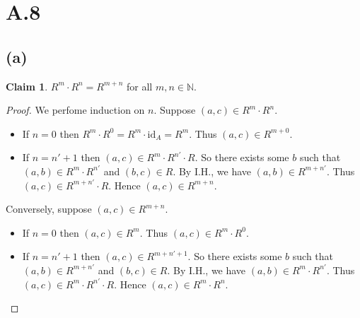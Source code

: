 \documentclass[autodetect-enginem]{article}
\title{}
\author{}
\date{}
\theoremstyle{plain}
\theoremstyle{definition}
\theoremstyle{definition}
\newtheorem*{claim}{Claim}
\begin{document}
\section*{A.8}
\subsection*{(a)}
    \begin{claim}
        $R^m \cdot R^n = R^{m+n}$ for all $m,n \in \mathbb{N}$.
    \end{claim}

    \begin{proof}
        We perfome induction on $n$.
        Suppose $(a,c) \in R^m \cdot R^n$.
        \begin{itemize}
            \item If $n = 0$ then $R^m \cdot R^0 = R^m \cdot \mathrm{id}_A = R^m$.
                    Thus $(a,c) \in R^{m+0}$.
            \item If $n = n' + 1$ then $(a,c) \in R^m \cdot R^{n'} \cdot R$.
                    So there exists some $b$ such that $(a,b) \in R^m \cdot R^{n'}$ and $(b,c) \in R$.
                    By I.H., we have $(a,b) \in R^{m+n'}$.
                    Thus $(a,c) \in R^{m+n'} \cdot R$.
                    Hence $(a,c) \in R^{m+n}$.
        \end{itemize}
        Conversely, suppose $(a,c) \in R^{m+n}$.
        \begin{itemize}
            \item If $n=0$ then $(a,c) \in R^m$. Thus $(a,c) \in R^m \cdot R^0$.
            \item If $n=n'+1$ then $(a,c) \in R^{m + n' + 1}$. So there exists some $b$ such that
                    $(a,b) \in R^{m+n'}$ and $(b,c) \in R$.
                    By I.H., we have $(a,b) \in R^{m} \cdot R^{n'}$.
                    Thus $(a,c) \in R^{m} \cdot R^{n'} \cdot R$.
                    Hence $(a,c) \in R^{m} \cdot R^{n}$.
        \end{itemize}
    \end{proof}
\end{document}
